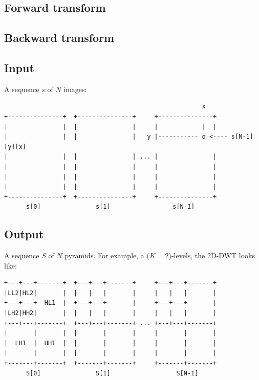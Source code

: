 \subsection{Forward transform}


\subsection{Backward transform}


\subsection{Input}
A sequence $s$ of $N$ images:

\begin{verbatim}
                                                      x 
+---------------+  +---------------+     +---------------+
|               |  |               |     |            |  |
|               |  |               |   y |----------- o <---- s[N-1][y][x]
|               |  |               | ... |               |
|               |  |               |     |               |
|               |  |               |     |               |
|               |  |               |     |               |
+---------------+  +---------------+     +---------------+
      s[0]               s[1]                 s[N-1]
\end{verbatim}

\subsection{Output}
A sequence $S$ of $N$ pyramids. For example, a ($K=2$)-levels, the
2D-DWT looks like:

\begin{verbatim}
+---+---+-------+  +---+---+-------+     +---+---+-------+
|LL2|HL2|       |  |   |   |       |     |   |   |       |
+---+---+  HL1  |  +---+---+       |     +---+---+       |
|LH2|HH2|       |  |   |   |       |     |   |   |       |
+---+---+-------+  +---+---+-------+ ... +---+---+-------+
|       |       |  |       |       |     |       |       |
|  LH1  |  HH1  |  |       |       |     |       |       |
|       |       |  |       |       |     |       |       |        
+-------+-------+  +-------+-------+     +-------+-------+
      S[0]               S[1]                  S[N-1]
\end{verbatim}



